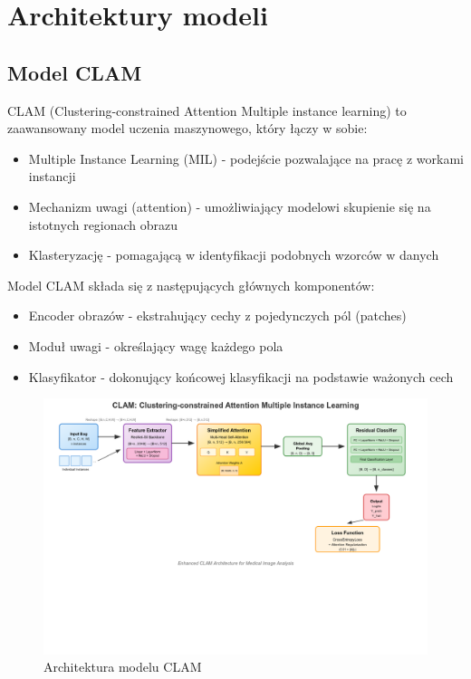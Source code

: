 \documentclass{article}
\begin{document}
\section{Architektury modeli}

\subsection{Model CLAM}
CLAM (Clustering-constrained Attention Multiple instance learning) to zaawansowany model uczenia maszynowego, który łączy w sobie:
\begin{itemize}
    \item Multiple Instance Learning (MIL) - podejście pozwalające na pracę z workami instancji
    \item Mechanizm uwagi (attention) - umożliwiający modelowi skupienie się na istotnych regionach obrazu
    \item Klasteryzację - pomagającą w identyfikacji podobnych wzorców w danych
\end{itemize}

Model CLAM składa się z następujących głównych komponentów:
\begin{itemize}
    \item Encoder obrazów - ekstrahujący cechy z pojedynczych pól (patches)
    \item Moduł uwagi - określający wagę każdego pola
    \item Klasyfikator - dokonujący końcowej klasyfikacji na podstawie ważonych cech
\end{itemize}

\begin{figure}[H]
    \centering
    \includegraphics[width=1.0\textwidth]{figures/clam_architecture.png}
    \caption{Architektura modelu CLAM}
    \label{fig:clam_arch}
\end{figure}
\end{document}
